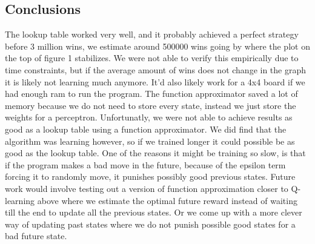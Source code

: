 \documentclass[12pt,a4paper]{article}
\begin{document}
\subsection*{Conclusions}
The lookup table worked very well, and it probably achieved a perfect strategy before 3 million wins, we estimate around 500000 wins going by where the plot on the top of figure 1 stabilizes. We were not able to verify this empirically due to time constraints, but if the average amount of wins does not change in the graph it is likely not learning much anymore. It'd also likely work for a 4x4 board if we had enough ram to run the program.
The function approximator saved a lot of memory because we do not need to store every state, instead we just store the weights for a perceptron. Unfortunatly, we were not able to achieve results as good as a lookup table using a function approximator. We did find that the algorithm was learning however, so if we trained longer it could possible be as good as the lookup table. One of the reasons it might be training so slow, is that if the program makes a bad move in the future, because of the epsilon term forcing it to randomly move, it punishes possibly good previous states. Future work would involve testing out a version of function approximation closer to Q-learning above where we estimate the optimal future reward instead of waiting till the end to update all the previous states. Or we come up with a more clever way of updating past states where we do not punish possible good states for a bad future state.    
\end{document}

